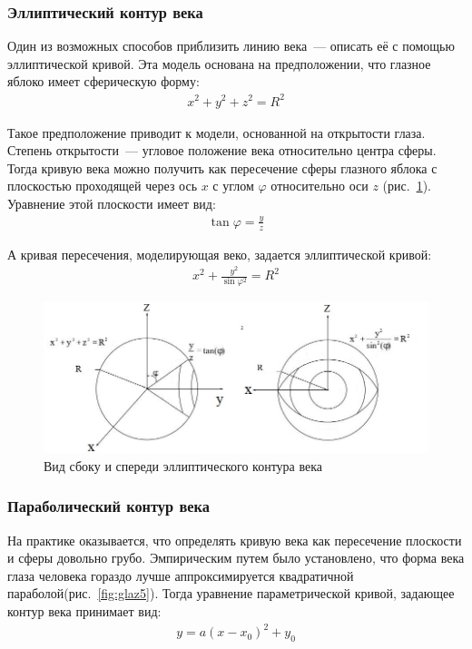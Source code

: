 \documentclass[12pt]{article} %
\begin{document}
\subsubsection{Эллиптический контур века}

Один из возможных способов приблизить линию века~--- описать её с помощью эллиптической кривой. Эта модель основана на предположении, что глазное яблоко имеет сферическую форму:
\begin{gather}\label{sphear}
	x^2+y^2+z^2= R^2
\end{gather}

Такое предположение приводит к модели, основанной на открытости глаза. Степень открытости~--- угловое положение века относительно центра сферы. Тогда кривую века можно получить как пересечение сферы глазного яблока с плоскостью проходящей через ось $x$ с углом $\varphi$ относительно оси $z$ (рис.~\ref{fig:glaz4}). Уравнение этой плоскости имеет вид:
\begin{gather}\label{el1}
	\tan{\varphi}= \frac{y}{z}
\end{gather}

А кривая пересечения, моделирующая веко, задается эллиптической кривой:
\begin{gather}\label{el2}
	x^2+\frac{y^2}{\sin{\varphi}^2}=R^2
\end{gather}

\begin{figure}[h]
	
	\centering
	
	\includegraphics[width=0.8\linewidth]{glaz4.jpg}
	
	\caption{Вид сбоку и спереди эллиптического контура века}
	
	\label{fig:glaz4}
	
\end{figure}


\subsubsection{Параболический контур века}

На практике оказывается, что определять кривую века как пересечение плоскости и сферы довольно грубо. Эмпирическим путем было установлено, что форма века глаза человека гораздо лучше аппроксимируется квадратичной параболой(рис.~\ref{fig:glaz5}). Тогда уравнение параметрической кривой, задающее контур века принимает вид:
\begin{gather}\label{par1}
	y = a(x-x_0)^2 + y_0
\end{gather}
\end{document}
